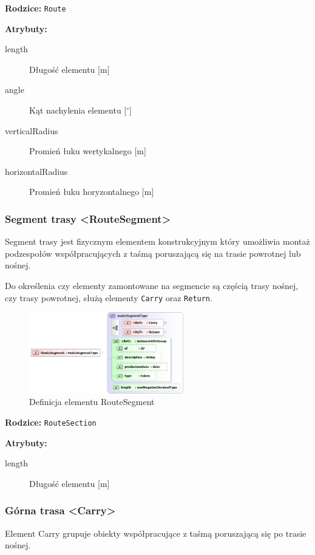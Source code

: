 \documentclass[12pt,a4paper]{article}
\begin{document}
\noindent\textbf{Rodzice:} \texttt{Route}

\noindent\textbf{Atrybuty:}
\begin{description}
\item[length] Długość elementu [m]
\item[angle] Kąt nachylenia elementu [$^\circ$]
\item[verticalRadius] Promień łuku wertykalnego [m]
\item[horizontalRadius] Promień łuku horyzontalnego [m]
\end{description}


\subsubsection{Segment trasy <RouteSegment>}
Segment trasy jest fizycznym elementem konstrukcyjnym który umożliwia montaż
podzespołów współpracujących z taśmą poruszającą się na trasie powrotnej lub
nośnej.

Do określenia czy elementy zamontowane na segmencie są częścią trasy nośnej, czy
trasy powrotnej, służą elementy {\tt Carry} oraz {\tt Return}.

\begin{figure}[H]
  \centering
  \includegraphics[width=0.6\textwidth]{png/liquid/RouteSegment}
  \caption{Definicja elementu RouteSegment}
  \label{fig:routeSegment-xsd}
\end{figure}

\noindent\textbf{Rodzice:} \texttt{RouteSection}

\noindent\textbf{Atrybuty:}
\begin{description}
\item[length] Długość elementu [m]
\end{description}


\subsubsection{Górna trasa <Carry>}
Element Carry grupuje obiekty współpracujące z taśmą poruszającą się po trasie
nośnej.
\end{document}
